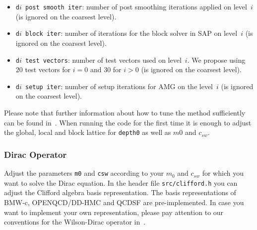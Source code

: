 \documentclass[a4paper,12pt]{scrartcl}
\begin{document}
\begin{itemize}
\begin{itemize}
    \item \texttt{d$i$ post smooth iter}: number of post smoothing iterations applied on level~$i$ (is ignored on the coarsest level).
    \item \texttt{d$i$ block iter}: number of iterations for the block solver in SAP on level~$i$ (is ignored on the coarsest level).
    \item \texttt{d$i$ test vectors}: number of test vectors used on level~$i$. We propose using $20$ test vectors for $i=0$ and $30$ for $i>0$ (is ignored on the coarsest level).
    \item \texttt{d$i$ setup iter}: number of setup iterations for AMG on the level~$i$ (is ignored on the coarsest level).
  \end{itemize}
\end{itemize}
Please note that further information about how to tune the method sufficiently can be found in~\cite{Frommer:2013kla,FroKaKrLeRo13,RottmannPhD}. When running the code for the first time it is enough to adjust the global, local and block lattice for \texttt{depth0} as well as $m0$ and $c_{sw}$.

\subsubsection{Dirac Operator}
Adjust the parameters \texttt{m0} and \texttt{csw} according to your $m_0$ and $c_{sw}$ for which you want to solve the Dirac equation. In the header file \texttt{src/clifford.h} you can adjust the Clifford algebra basis representation. The basis representations of BMW-c, OPENQCD/DD-HMC and QCDSF are pre-implemented. In case you want to implement your own representation, please pay attention to our conventions for the Wilson-Dirac operator in~\cite{FroKaKrLeRo13,RottmannPhD}.
\end{document}
